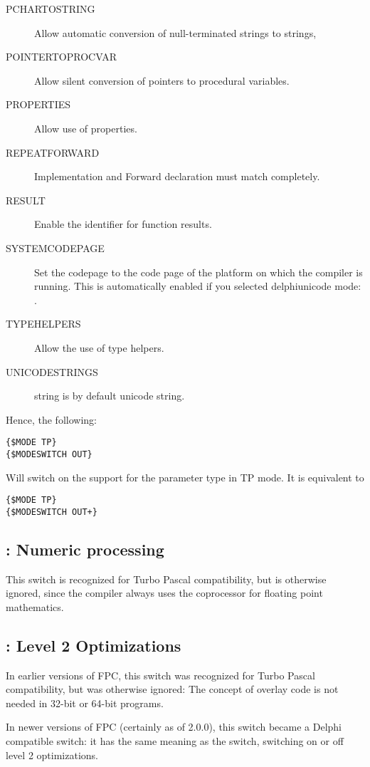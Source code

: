 \begin{description}
\item[PCHARTOSTRING] Allow automatic conversion of null-terminated strings to strings,
\item[POINTERTOPROCVAR] Allow silent conversion of pointers to procedural variables.
\item[PROPERTIES] Allow use of properties.
\item[REPEATFORWARD] Implementation and Forward declaration must match completely.
\item[RESULT] Enable the  identifier for function results.
\item[SYSTEMCODEPAGE] Set the codepage to the code page of the platform on
which the compiler is running. This is automatically enabled if you selected
delphiunicode mode: .  
\item[TYPEHELPERS] Allow the use of type helpers.
\item[UNICODESTRINGS] string is by default unicode string.
\end{description}

Hence, the following:
\begin{verbatim}
{$MODE TP}
{$MODESWITCH OUT}
\end{verbatim}
Will switch on the support for the  parameter type in TP mode. It
is equivalent to
\begin{verbatim}
{$MODE TP}
{$MODESWITCH OUT+}
\end{verbatim}

\subsection{ : Numeric processing }

This switch is recognized for Turbo Pascal compatibility, but is otherwise
ignored, since the compiler always uses the coprocessor for floating point
mathematics.

\subsection{ : Level 2 Optimizations }

In earlier versions of FPC, this switch was recognized for Turbo Pascal 
compatibility, but was otherwise ignored: The concept of overlay code 
is not needed in 32-bit or 64-bit programs.

In newer versions of FPC (certainly as of 2.0.0), this switch became a
Delphi compatible switch: it has the same meaning as the
 switch, switching on or off level 2 optimizations.

